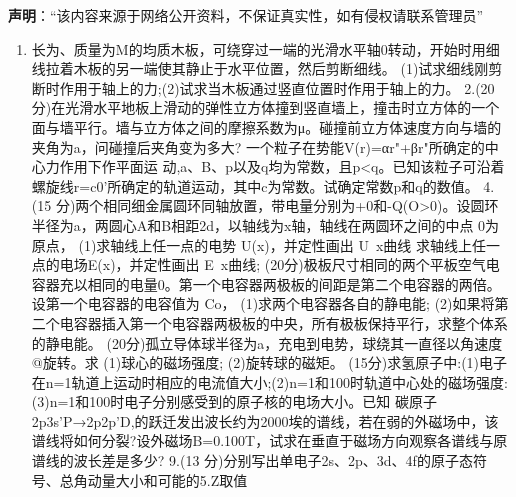 
\textbf{声明}：“该内容来源于网络公开资料，不保证真实性，如有侵权请联系管理员”
\begin{enumerate}
\item 长为、质量为M的均质木板，可绕穿过一端的光滑水平轴0转动，开始时用细线拉着木板的另一端使其静止于水平位置，然后剪断细线。
(1)试求细线刚剪断时作用于轴上的力;(2)试求当木板通过竖直位置时作用于轴上的力。
2.(20分)在光滑水平地板上滑动的弹性立方体撞到竖直墙上，撞击时立方体的一个面与墙平行。墙与立方体之间的摩擦系数为μ。碰撞前立方体速度方向与墙的夹角为a，问碰撞后夹角变为多大?
一个粒子在势能V(r)=αr"+βr"所确定的中心力作用下作平面运
动,a、B、p以及q均为常数，且p<q。已知该粒子可沿着螺旋线r=c0’所确定的轨道运动，其中c为常数。试确定常数p和q的数值。
4.(15 分)两个相同细金属圆环同轴放置，带电量分别为+0和-Q(O>0)。设圆环半径为a，两圆心A和B相距2d，以轴线为x轴，轴线在两圆环之间的中点 0为原点，
(1)求轴线上任一点的电势 U(x)，并定性画出 U~x曲线
求轴线上任一点的电场E(x)，并定性画出 E~x曲线;
(20分)极板尺寸相同的两个平板空气电容器充以相同的电量0。第一个电容器两极板的间距是第二个电容器的两倍。设第一个电容器的电容值为 Co，
(1)求两个电容器各自的静电能;
(2)如果将第二个电容器插入第一个电容器两极板的中央，所有极板保持平行，求整个体系的静电能。
(20分)孤立导体球半径为a，充电到电势，球绕其一直径以角速度@旋转。求
(1)球心的磁场强度;
(2)旋转球的磁矩。
(15分)求氢原子中:(1)电子在n=1轨道上运动时相应的电流值大小;(2)n=1和100时轨道中心处的磁场强度:(3)n=1和100时电子分别感受到的原子核的电场大小。已知
碳原子 2p3s'P→2p2p'D,的跃迁发出波长约为2000埃的谱线，若在弱的外磁场中，该谱线将如何分裂?设外磁场B=0.100T，试求在垂直于磁场方向观察各谱线与原谱线的波长差是多少?
9.(13 分)分别写出单电子2s、2p、3d、4f的原子态符号、总角动量大小和可能的5.Z取值
\end{enumerate}
